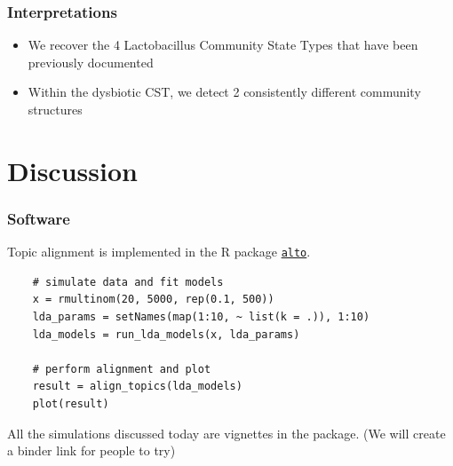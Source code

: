 \documentclass[hyperref={colorlinks=true, linkcolor=violet, citecolor=SeaGreen}]{beamer}
\begin{document}
\begin{frame}
  \frametitle{Interpretations}
  \begin{itemize}
    \item We recover the 4 Lactobacillus Community State Types that have been
    previously documented
    \item Within the dysbiotic CST, we detect 2 consistently different community
    structures
  \end{itemize}
  \begin{figure}
  \end{figure}
\end{frame}

\section{Discussion}

\begin{frame}[fragile]
  \frametitle{Software}
    Topic alignment is implemented in the R package
    \href{lasy.github.io/alto}{\texttt{alto}}.

    \begin{lstlisting}
    # simulate data and fit models
    x = rmultinom(20, 5000, rep(0.1, 500))
    lda_params = setNames(map(1:10, ~ list(k = .)), 1:10)
    lda_models = run_lda_models(x, lda_params)

    # perform alignment and plot
    result = align_topics(lda_models)
    plot(result)
    \end{lstlisting}

    All the simulations discussed today are vignettes in the package. (We will
    create a binder link for people to try)
\end{frame}
\end{document}
